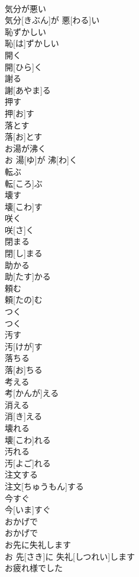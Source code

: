 \documentclass[8pt]{extreport}
\begin{document}
\begin{CJK}{UTF8}{min}
\\	気分が悪い	
\\	気分[きぶん]が 悪[わる]い
\\	恥ずかしい	
\\	恥[は]ずかしい
\\	開く	
\\	開[ひら]く
\\	謝る	
\\	謝[あやま]る
\\	押す	
\\	押[お]す
\\	落とす	
\\	落[お]とす
\\	お湯が沸く	
\\	お 湯[ゆ]が 沸[わ]く
\\	転ぶ	
\\	転[ころ]ぶ
\\	壊す	
\\	壊[こわ]す
\\	咲く	
\\	咲[さ]く
\\	閉まる	
\\	閉[し]まる
\\	助かる	
\\	助[たす]かる
\\	頼む	
\\	頼[たの]む
\\	つく	
\\	つく
\\	汚す	
\\	汚[けが]す
\\	落ちる	
\\	落[お]ちる
\\	考える	
\\	考[かんが]える
\\	消える	
\\	消[き]える
\\	壊れる	
\\	壊[こわ]れる
\\	汚れる	
\\	汚[よご]れる
\\	注文する	
\\	注文[ちゅうもん]する
\\	今すぐ	
\\	今[いま]すぐ
\\	おかげで	
\\	おかげで
\\	お先に失礼します	
\\	お 先[さき]に 失礼[しつれい]します
\\	お疲れ様でした	

\end{CJK}
\end{document}

